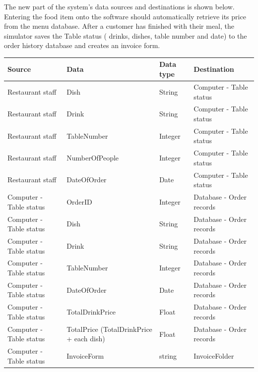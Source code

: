 \begin{center}

The new part of the system's data sources and destinations is shown below. Entering the food item onto the software should automatically retrieve its price from the menu database. After a customer has finished with their meal, the simulator saves the Table status ( drinks, dishes, table number and date) to the order history database and creates an invoice form.

\begin{tabular}{ | p{3cm} | p{3cm} | p{1cm} | p{3cm} |  }
    \hline
    \textbf{Source} & \textbf{Data} & \textbf{Data type} & \textbf{Destination} \\ \hline
    Restaurant staff &Dish & String &Computer - Table status \\ \hline
   Restaurant staff & Drink & String & Computer - Table status \\ \hline
  Restaurant staff & TableNumber &Integer & Computer - Table status \\ \hline
    Restaurant staff & NumberOfPeople &Integer &Computer - Table status \\ \hline
    Restaurant staff & DateOfOrder & Date & Computer - Table status \\ \hline
   Computer - Table status & OrderID  & Integer & Database - Order records  \\ \hline
   Computer - Table status & Dish  & String & Database - Order records  \\ \hline
   Computer - Table status & Drink  & String & Database - Order records  \\ \hline
   Computer - Table status & TableNumber  & Integer & Database - Order records  \\ \hline
   Computer - Table status & DateOfOrder  & Date & Database - Order records  \\ \hline
   Computer - Table status & TotalDrinkPrice & Float & Database - Order records  \\ \hline
   Computer - Table status & TotalPrice \newline (TotalDrinkPrice + each dish) & Float &Database - Order records  \\ \hline
   Computer - Table status & InvoiceForm & string & InvoiceFolder  \\ \hline

\end{tabular}
\label{tab:range_examples}
\end{center}

